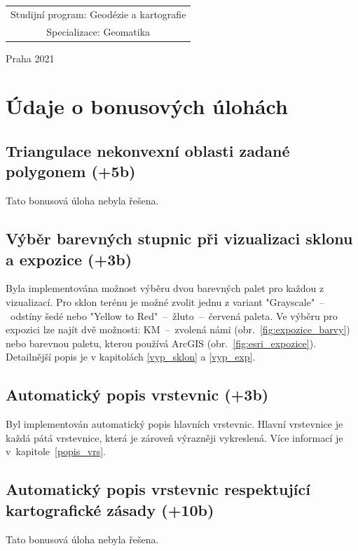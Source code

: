 \documentclass[a4paper, 12pt, oneside, titlepage]{article} %
\begin{document}
\begin{center}
\begin{tabular}{c}
Studijní program: Geodézie a kartografie \\
\noalign{\vspace{2mm}}

Specializace: Geomatika\\

\end{tabular}


\vfill

Praha 2021

\end{center}



\clearpage
\section{Údaje o bonusových úlohách}
\subsection{Triangulace nekonvexní oblasti zadané polygonem (+5b)}
Tato bonusová úloha nebyla řešena.

\subsection{Výběr barevných stupnic při vizualizaci sklonu a expozice (+3b)}
Byla implementována možnost výběru dvou barevných palet pro každou z vizualizací. Pro sklon terénu je možné zvolit jednu z variant "Grayscale"~--~odstíny šedé nebo "Yellow to Red"~--~žluto~--~červená paleta. Ve výběru pro expozici lze najít dvě možnosti: KM~--~zvolená námi (obr.~\ref{fig:expozice_barvy}) nebo barevnou paletu, kterou používá ArcGIS (obr.~\ref{fig:esri_expozice}). Detailnější popis je v kapitolách \ref{vyp_sklon} a \ref{vyp_exp}.


\subsection{Automatický popis vrstevnic (+3b)}
Byl implementován automatický popis hlavních vrstevnic. Hlavní vrstevnice je každá pátá vrstevnice, která je zároveň výrazněji vykreslená. Více informací je v~kapitole~\ref{popis_vrs}.

\subsection{Automatický popis vrstevnic respektující kartografické zásady (+10b)}
Tato bonusová úloha nebyla řešena.
\end{document}
